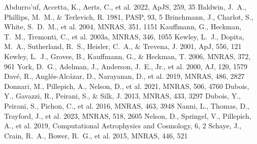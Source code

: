 \documentclass[twocolumn]{aastex631}
\begin{document}
\begin{thebibliography}{}
 Abdurro'uf, Accetta, K., Aerts, C., et al. 2022, ApJS, 259, 35
 Baldwin, J.~A., Phillips, M.~M., \& Terlevich, R. 1981, PASP, 93, 5
 Brinchmann, J., Charlot, S., White, S.~D.~M., et al. 2004, MNRAS, 351, 1151
 Kauffmann, G., Heckman, T.~M., Tremonti, C., et al. 2003a, MNRAS, 346, 1055
 Kewley, L.~J., Dopita, M.~A., Sutherland, R.~S., Heisler, C.~A., \& Trevena, J. 2001, ApJ, 556, 121
 Kewley, L.~J., Groves, B., Kauffmann, G., \& Heckman, T. 2006, MNRAS, 372, 961
 York, D.~G., Adelman, J., Anderson, J.~E., Jr., et al. 2000, AJ, 120, 1579
 Dav\'e, R., Angl\'es-Alc\'azar, D., Narayanan, D., et al. 2019, MNRAS, 486, 2827
 Donnari, M., Pillepich, A., Nelson, D., et al. 2021, MNRAS, 506, 4760
 Dubois, Y., Gavazzi, R., Peirani, S., \& Silk, J. 2013, MNRAS, 433, 3297
 Dubois, Y., Peirani, S., Pichon, C., et al. 2016, MNRAS, 463, 3948
 Nanni, L., Thomas, D., Trayford, J., et al. 2023, MNRAS, 518, 2605
 Nelson, D., Springel, V., Pillepich, A., et al. 2019, Computational Astrophysics and Cosmology, 6, 2
 Schaye, J., Crain, R.~A., Bower, R.~G., et al. 2015, MNRAS, 446, 521
\end{thebibliography}
\end{document}
